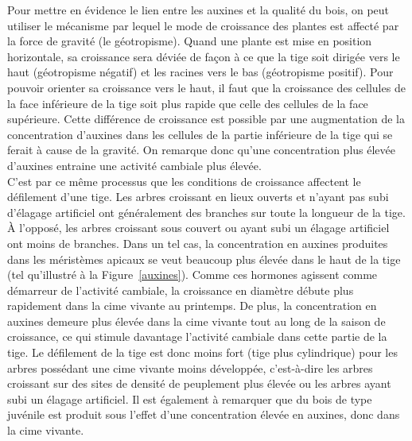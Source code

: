 Pour mettre en évidence le lien entre les auxines et la qualité du bois, on peut utiliser le mécanisme par lequel le mode de croissance des plantes est affecté par la force de gravité (le géotropisme). Quand une plante est mise en position horizontale, sa croissance sera déviée de façon à ce que la tige soit dirigée vers le haut (géotropisme négatif) et les racines vers le bas (géotropisme positif). Pour pouvoir orienter sa croissance vers le haut, il faut que la croissance des cellules de la face inférieure de la tige soit plus rapide que celle des cellules de la face supérieure. Cette différence de croissance est possible par une augmentation de la concentration d'auxines dans les cellules de la partie inférieure de la tige qui se ferait à cause de la gravité. On remarque donc qu'une concentration plus élevée d'auxines entraine une activité cambiale plus élevée. \\

C'est par ce même processus que les conditions de croissance affectent le défilement d'une tige. Les arbres croissant en lieux ouverts et n'ayant pas subi d'élagage artificiel ont généralement des branches sur toute la longueur de la tige. À l'opposé, les arbres croissant sous couvert ou ayant subi un élagage artificiel ont moins de branches. Dans un tel cas, la concentration en auxines produites dans les méristèmes apicaux se veut beaucoup plus élevée dans le haut de la tige (tel qu'illustré à la Figure~\ref{auxines}). Comme ces hormones agissent comme démarreur de l'activité cambiale, la croissance en diamètre débute plus rapidement dans la cime vivante au printemps. De plus, la concentration en auxines demeure plus élevée dans la cime vivante tout au long de la saison de croissance, ce qui stimule davantage l'activité cambiale dans cette partie de la tige. Le défilement de la tige est donc moins fort (tige plus cylindrique) pour les arbres possédant une cime vivante moins développée, c'est-à-dire les arbres croissant sur des sites de densité de peuplement plus élevée ou les arbres ayant subi un élagage artificiel. Il est également à remarquer que du bois de type juvénile est produit sous l'effet d'une concentration élevée en auxines, donc dans la cime vivante.  


